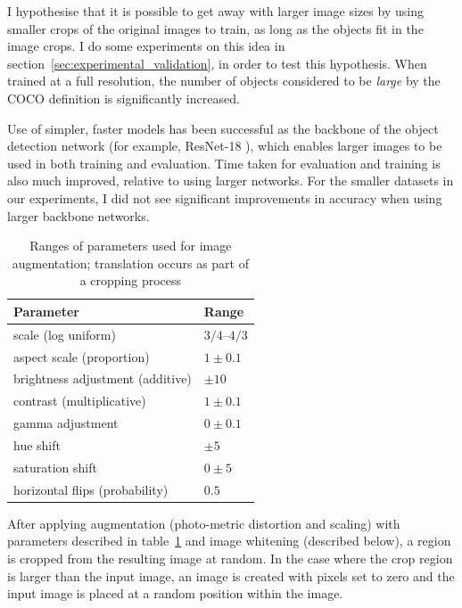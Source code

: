 I hypothesise that it is possible to get away with larger image sizes by using smaller crops of the original images to train, as long as the objects fit in the image crops. I do some experiments on this idea in section~\ref{sec:experimental_validation}, in order to test this hypothesis. When trained at a full resolution, the number of objects considered to be \emph{large} by the COCO definition is significantly increased.

Use of simpler, faster models has been successful as the backbone of the object detection network (for example, ResNet-18 \cite{He}), which enables larger images to be used in both training and evaluation. Time taken for evaluation and training is also much improved, relative to using larger networks. For the smaller datasets in our experiments, I did not see significant improvements in accuracy when using larger backbone networks.

\begin{table}[h]
  \centering
    \caption{Ranges of parameters used for image augmentation; translation occurs as part of a cropping process}
    
  \begin{tabular}{ l  l }
    Parameter & Range \\
    \toprule
    scale (log uniform) & ${3/4}$--${4/3}$  \\ 
    aspect scale (proportion)  & $ 1 \pm 0.1 $  \\ 
    brightness adjustment (additive) & $ \pm 10 $ \\ 
    contrast (multiplicative) & $ 1 \pm 0.1 $ \\
    gamma adjustment & $ 0 \pm 0.1 $ \\ 
    hue shift & $ \pm 5 $ \\ 
    saturation shift & $ 0 \pm 5 $ \\ 
    
    horizontal flips (probability) & $ 0.5 $ \\ 
    
    \bottomrule
  \end{tabular}
\label{tab:obj_augmentation}
\end{table}

After applying augmentation (photo-metric distortion and scaling) with parameters described in table~\ref{tab:obj_augmentation} and image whitening (described below), a region is cropped from the resulting image at random. In the case where the crop region is larger than the input image, an image is created with pixels set to zero and the input image is placed at a random position within the image.

